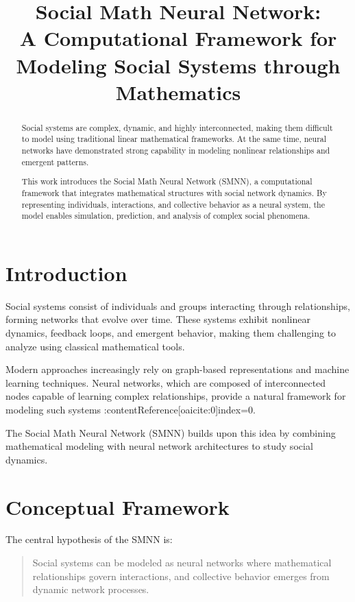 \documentclass[12pt]{article}
\title{\textbf{Social Math Neural Network: \\ A Computational Framework for Modeling Social Systems through Mathematics}}
\author{}
\date{}
\begin{document}
\maketitle

\begin{abstract}
Social systems are complex, dynamic, and highly interconnected, making them difficult to model using traditional linear mathematical frameworks. At the same time, neural networks have demonstrated strong capability in modeling nonlinear relationships and emergent patterns.

This work introduces the Social Math Neural Network (SMNN), a computational framework that integrates mathematical structures with social network dynamics. By representing individuals, interactions, and collective behavior as a neural system, the model enables simulation, prediction, and analysis of complex social phenomena.
\end{abstract}

\section{Introduction}

Social systems consist of individuals and groups interacting through relationships, forming networks that evolve over time. These systems exhibit nonlinear dynamics, feedback loops, and emergent behavior, making them challenging to analyze using classical mathematical tools.

Modern approaches increasingly rely on graph-based representations and machine learning techniques. Neural networks, which are composed of interconnected nodes capable of learning complex relationships, provide a natural framework for modeling such systems :contentReference[oaicite:0]{index=0}.

The Social Math Neural Network (SMNN) builds upon this idea by combining mathematical modeling with neural network architectures to study social dynamics.

\section{Conceptual Framework}

The central hypothesis of the SMNN is:

\begin{quote}
Social systems can be modeled as neural networks where mathematical relationships govern interactions, and collective behavior emerges from dynamic network processes.
\end{quote}
\end{document}
